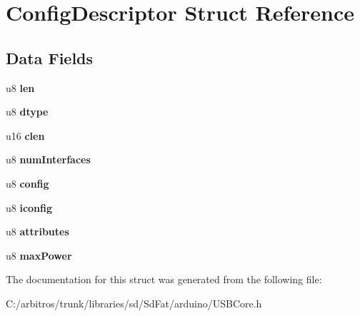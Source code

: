 \hypertarget{struct_config_descriptor}{\section{Config\-Descriptor Struct Reference}
\label{struct_config_descriptor}
}
\subsection*{Data Fields}
\begin{DoxyCompactItemize}
\item 
\hypertarget{struct_config_descriptor_afbf3f3230446569534d5f466aaf4c23b}{u8 {\bfseries len}}\label{struct_config_descriptor_afbf3f3230446569534d5f466aaf4c23b}

\item 
\hypertarget{struct_config_descriptor_a0bb419531ec75697e63e9109fecf81b0}{u8 {\bfseries dtype}}\label{struct_config_descriptor_a0bb419531ec75697e63e9109fecf81b0}

\item 
\hypertarget{struct_config_descriptor_aa5da249d1d5f0d5206337b967ca02fc1}{u16 {\bfseries clen}}\label{struct_config_descriptor_aa5da249d1d5f0d5206337b967ca02fc1}

\item 
\hypertarget{struct_config_descriptor_a14f358f5820bd4d472a16cbe4ca8cee9}{u8 {\bfseries num\-Interfaces}}\label{struct_config_descriptor_a14f358f5820bd4d472a16cbe4ca8cee9}

\item 
\hypertarget{struct_config_descriptor_afbc86c343de9cddaf950200827a9bceb}{u8 {\bfseries config}}\label{struct_config_descriptor_afbc86c343de9cddaf950200827a9bceb}

\item 
\hypertarget{struct_config_descriptor_aa15641f1c55e92825e8ba97b1dc504a1}{u8 {\bfseries iconfig}}\label{struct_config_descriptor_aa15641f1c55e92825e8ba97b1dc504a1}

\item 
\hypertarget{struct_config_descriptor_a11c20ff21a3a4209dce65e2d537374bd}{u8 {\bfseries attributes}}\label{struct_config_descriptor_a11c20ff21a3a4209dce65e2d537374bd}

\item 
\hypertarget{struct_config_descriptor_a081afc2b5fe7d7e625c612cc09b17015}{u8 {\bfseries max\-Power}}\label{struct_config_descriptor_a081afc2b5fe7d7e625c612cc09b17015}

\end{DoxyCompactItemize}


The documentation for this struct was generated from the following file\-:\begin{DoxyCompactItemize}
\item 
C\-:/arbitros/trunk/libraries/sd/\-Sd\-Fat/arduino/U\-S\-B\-Core.\-h\end{DoxyCompactItemize}
